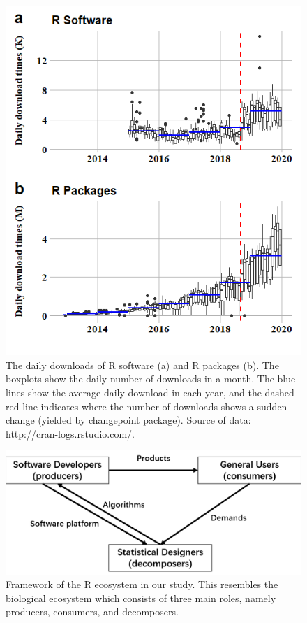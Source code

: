 \begin{Schunk}
\begin{figure}
\includegraphics[width=0.8\linewidth,height=0.5\textheight]{fig1} \caption[The daily downloads of R software (a) and R packages (b)]{The daily downloads of R software (a) and R packages (b). The boxplots show the daily number of downloads in a month. The blue lines show the average daily download in each year, and the dashed red line indicates where the number of downloads shows a sudden change (yielded by changepoint package). Source of data: http://cran-logs.rstudio.com/. }\label{fig:fig1}
\end{figure}
\end{Schunk}

\begin{Schunk}
\begin{figure}
\includegraphics[width=1\linewidth,height=0.3\textheight]{fig2} \caption[Framework of the R ecosystem in our study]{Framework of the R ecosystem in our study. This resembles the biological ecosystem which consists of three main roles, namely producers, consumers, and decomposers. }\label{fig:fig2}
\end{figure}
\end{Schunk}

